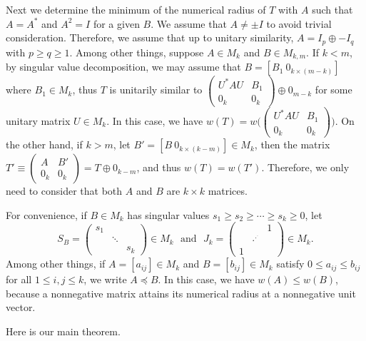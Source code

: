 \documentclass[11pt]{article}
\numberwithin{equation}{section}
\def\rddots{\cdot^{\displaystyle\cdot^{\displaystyle\cdot}}}
\begin{document}
\medskip
 Next we determine the minimum of the numerical radius of $T$ with $A$ such that $A=A^*$ and $A^2=I$
 for a given $B$.  We assume that $A \ne \pm I$ to avoid trivial consideration.
Therefore, we assume that up to unitary similarity, $A = I_p \oplus -I_q$ with
 $p \ge q \ge 1$.  Among other things, suppose $A\in M_k$ and $B\in M_{k, m}$. If $k<m$, by singular value decomposition, we may assume that $B=[B_1 \ 0_{k\times (m-k)}]$ where $B_1\in M_k$, thus $T$ is unitarily similar to $\begin{pmatrix} U^*AU & B_1 \\ 0_k & 0_k\end{pmatrix}\oplus 0_{m-k}$ for some unitary matrix $U\in M_k$. In this case, we have $w(T)=w\Big(\begin{pmatrix} U^*AU & B_1 \\ 0_k & 0_k\end{pmatrix}\Big)$. On the other hand, if $k>m$, let $B'=[B \ 0_{k\times (k-m)}]\in M_k$, then the matrix $T'\equiv\begin{pmatrix} A & B' \\ 0_k & 0_k\end{pmatrix}=T\oplus 0_{k-m}$, and thus $w(T)=w(T')$. Therefore, we only need to consider that both $A$ and $B$ are $k\times k$ matrices.

 For convenience, if $B\in M_k$ has singular values $s_1\ge s_2\ge\cdots\ge s_k\ge 0$, let
\begin{equation}\label{eq1}
S_B=\begin{pmatrix} s_1 & & \\ & \ddots & \\ & & s_k\end{pmatrix}\in M_k \ \ \ \mbox{and} \ \ \ J_k=\begin{pmatrix} & & 1\\ & \rddots & \\ 1 & & \end{pmatrix}\in M_k.
\end{equation}
Among other things, if $A=[a_{ij}]\in M_k$ and $B=[b_{ij}]\in M_k$ satisfy $0\le a_{ij}\le b_{ij}$ for all $1\le i,j\le k$, we write $A\preceq B$. In this case, we have $w(A)\le w(B)$, because a nonnegative matrix attains its numerical radius at a nonnegative unit vector.

Here is our main theorem.
\end{document}
